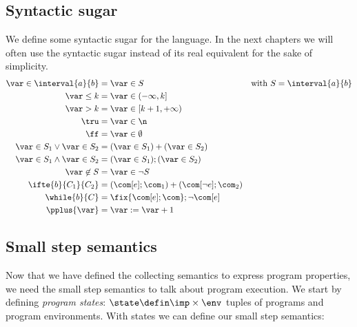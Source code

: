 \subsection{Syntactic sugar}\label{sub:sugar}
We define some syntactic sugar for the language. In the next chapters
we will often use the syntactic sugar instead of its real equivalent
for the sake of simplicity.
\begin{align*}
  \var \in \interval{a}{b} & = \var \in S & \text{with } S = \interval{a}{b}\\
  \var \leq k & = \var \in (-\infty, k]\\
  \var > k & = \var \in [k+1, + \infty) \\
  \tru & = \var \in \n \\
  \ff & = \var \in \emptyset \\
  \var \in S_1 \vee \var \in S_2 & = (\var \in S_1) + (\var \in S_2) \\ 
  \var \in S_1 \wedge \var \in S_2 & = (\var \in S_1);(\var \in S_2) \\
  \var \not\in S & = \var \in \neg S \\
  \ifte{b}{C_1}{C_2} & = (\com[e];\com_1) + (\com[\neg e];\com_2) \\
  \while{b}{C} & = \fix{\com[e];\com};\neg\com[e] \\
  \pplus{\var} & = \var := \var + 1
\end{align*}

\subsection{Small step semantics}\label{sub:sos}

Now that we have defined the collecting semantics to express program
properties, we need the small step semantics to talk about program
execution. We start by defining \emph{program states}:
\(\state \defin \imp \times \env\) tuples of programs and program
environments.  With states we can define our small step semantics:

